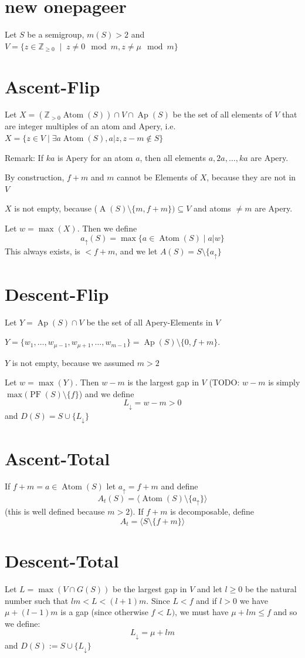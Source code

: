 \documentclass[11pt, a4paper]{article}
\def \N{{\mathbb Z}_{\geq 0}}
\def \Npos{{\mathbb Z}_{>0}}
\begin{document}
\section{new onepageer}
Let $S$ be a semigroup, $m(S)>2$ and $V=\{z\in\N \;\mid\; z \neq 0 \mod m, z \neq \mu \mod m\}$
\section{Ascent-Flip}
Let $X = (\Npos \operatorname{Atom}(S)) \cap V \cap \operatorname{Ap}(S)$ be the set of all elements of $V$
that are integer multiples of an atom and Apery, i.e. $X=\{z\in V \mid \exists a \operatorname{Atom}(S), a | z, z-m \notin S\}$

Remark: If $ka$ is Apery for an atom $a$, then all elements $a,2a,\dots,ka$ are Apery.

By construction, $f+m$ and $m$ cannot be Elements of $X$, because they are not in $V$

$X$ is not empty, because ($\operatorname{A}(S)\setminus \{m,f+m\}) \subseteq V$ and atoms $\neq m$ are Apery.

Let $w=\max(X)$. Then 
we define 
\[
a_{\uparrow}(S)=\max \{ a \in \operatorname{Atom}(S) \mid a | w \}
\]
This always exists, is $<f+m$, and we let $A(S)=S \setminus \{a_\uparrow\}$
%
%
%
\section{Descent-Flip}
Let $Y = \operatorname{Ap}(S) \cap V$ be the set of all Apery-Elements in $V$

$Y=\{w_1,\dots,w_{\mu-1},w_{\mu+1},\dots,w_{m-1}\}=\operatorname{Ap}(S)\setminus\{0,f+m\}$.

$Y$ is not empty, because we assumed $m>2$

Let $w=\max(Y)$. Then $w-m$ is the largest gap in $V$ 
(TODO: $w-m$ is simply $\max(\operatorname{PF}(S)\setminus \{f\}$)
and we define
\[
L_\downarrow = w-m > 0
\]
and $D(S)=S \cup \{L_\downarrow\}$
%
%
%
\section{Ascent-Total}
If $f+m = a \in \operatorname{Atom}(S)$ let $a_\uparrow = f+m$ and define
\[
A_{t}(S) = \langle \operatorname{Atom}(S)\setminus \{ a_\uparrow \} \rangle
\]
(this is well defined because $m>2$).
If $f+m$ is decomposable, define 
\[
A_{t} = \langle S \setminus \{f+m\}\rangle
\]
%
%
%
\section{Descent-Total}
Let $L = \max (V\cap G(S))$ be the largest gap in $V$ and let $l\geq 0$
be the natural number such that $lm < L <(l+1)m$. Since $L<f$ and if $l>0$ we have $\mu+(l-1)m$ is a gap (since otherwise $f<L)$, we must have
$\mu + lm \leq f$ and so we define:
\[
L_\downarrow = \mu+lm
\]
and $D(S):= S \cup \{ L_\downarrow \}$
\end{document}
